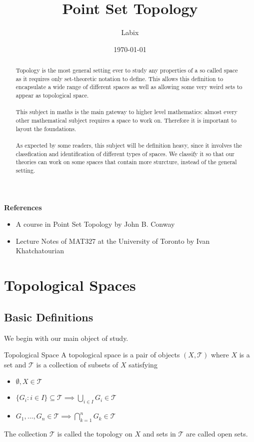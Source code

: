 \documentclass[a4paper]{article}
\title{Point Set Topology}
\author{Labix}
\date{\today}
\begin{document}
\maketitle
\begin{abstract}
Topology is the most general setting ever to study any properties of a so called space as it requires only set-theoretic notation to define. This allows this definition to encapsulate a wide range of different spaces as well as allowing some very weird sets to appear as topological space. \\~\\
This subject in maths is the main gateway to higher level mathematics: almost every other mathematical subject requires a space to work on. Therefore it is important to layout the foundations. \\~\\
As expected by some readers, this subject will be definition heavy, since it involves the classfication and identification of different types of spaces. We classify it so that our theories can work on some spaces that contain more sturcture, instead of the general setting. 
\end{abstract}
\textbf{References}
\begin{itemize}
\item A course in Point Set Topology by John B. Conway
\item Lecture Notes of MAT327 at the University of Toronto by Ivan Khatchatourian
\end{itemize}
\pagebreak
\tableofcontents
\pagebreak
\section{Topological Spaces}
\subsection{Basic Definitions}
We begin with our main object of study. 
\begin{defn}{Topological Space}{} A topological space is a pair of objects $(X,\mathcal{T})$ where $X$ is a set and $\mathcal{T}$ is a collection of subsets of $X$ satisfying
\begin{itemize}
\item $\emptyset,X\in\mathcal{T}$
\item $\{G_i:i\in I\}\subseteq\mathcal{T}\implies\bigcup_{i\in I}G_i\in\mathcal{T}$
\item $G_1,\dots,G_n\in\mathcal{T}\implies\bigcap_{k=1}^nG_k\in\mathcal{T}$
\end{itemize} The collection $\mathcal{T}$ is called the topology on $X$ and sets in $\mathcal{T}$ are called open sets. 
\end{defn}
\end{document}
